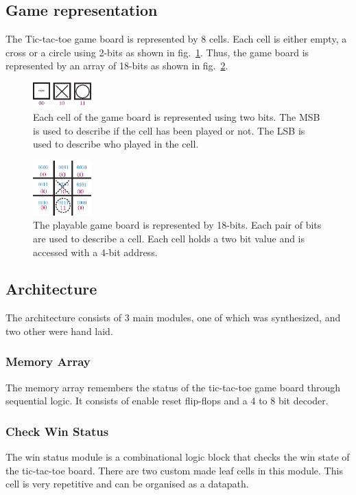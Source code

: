 \documentclass[]{article}
\begin{document}
\subsection{Game representation}
The Tic-tac-toe game board is represented by 8 cells. Each cell is either empty, a cross or a circle using 2-bits as shown in fig.~\ref{fig:cell-representation}. Thus, the game board is represented by an array of 18-bits as shown in fig.~\ref{fig:gBoard-representation}.

\begin{figure}
\centering
\includegraphics[width=0.2\textwidth]{cell-representation}
\caption{Each cell of the game board is represented using two bits. The MSB is used to describe if the cell has been played or not. The LSB is used to describe who played in the cell.}
\label{fig:cell-representation}
\end{figure}

\begin{figure}
\centering
\includegraphics[width=0.2\textwidth]{gBoard-representation}
\caption{The playable game board is represented by 18-bits. Each pair of bits are used to describe a cell. Each cell holds a two bit value and is accessed with a 4-bit address.}
\label{fig:gBoard-representation}
\end{figure}

\subsection{Architecture}
The architecture consists of 3 main modules, one of which was synthesized, and two other were hand laid.

\subsubsection{Memory Array}
The memory array remembers the status of the tic-tac-toe game board through sequential logic. It consists of enable reset flip-flops and a 4 to 8 bit decoder.
\subsubsection{Check Win Status}
The win status module is a combinational logic block that checks the win state of the tic-tac-toe board. There are two custom made leaf cells in this module. This cell is very repetitive and can be organised as a datapath.
\end{document}
